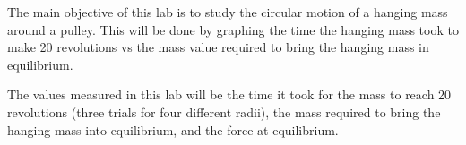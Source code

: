{The main objective of this lab is to study the circular motion of a hanging mass around a pulley.
This will be done by graphing the time the hanging mass took to make 20 revolutions vs the
mass value required to bring the hanging mass in equilibrium.}

{The values measured in this lab
will be the time it took for the mass to reach 20 revolutions (three trials for four different radii), the mass required to bring the hanging mass into equilibrium, and the force at equilibrium.}

{}

